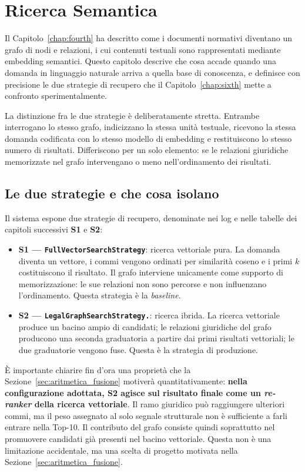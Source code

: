 \chapter{Ricerca Semantica}\label{chap:fifth}

\inlineminitoc

Il Capitolo~\ref{chap:fourth} ha descritto come i documenti normativi diventano un grafo di nodi e relazioni, i cui contenuti testuali sono rappresentati mediante embedding semantici. Questo capitolo descrive che cosa accade quando una domanda in linguaggio naturale arriva a quella base di conoscenza, e definisce con precisione le due strategie di recupero che il Capitolo~\ref{chap:sixth} mette a confronto sperimentalmente.

La distinzione fra le due strategie è deliberatamente stretta. Entrambe interrogano lo stesso grafo, indicizzano la stessa unità testuale, ricevono la stessa domanda codificata con lo stesso modello di embedding e restituiscono lo stesso numero di risultati. Differiscono per un solo elemento: se le relazioni giuridiche memorizzate nel grafo intervengano o meno nell'ordinamento dei risultati.

\section{Le due strategie e che cosa isolano}

Il sistema espone due strategie di recupero, denominate nei log e nelle tabelle dei capitoli successivi \textbf{S1} e \textbf{S2}:

\begin{itemize}
    \item \textbf{S1 --- \texttt{FullVectorSearchStrategy}}: ricerca vettoriale pura. La domanda diventa un vettore, i commi vengono ordinati per similarità coseno e i primi $k$ costituiscono il risultato. Il grafo interviene unicamente come supporto di memorizzazione: le sue relazioni non sono percorse e non influenzano l'ordinamento. Questa strategia è la \textit{baseline}.
    \item \textbf{S2 --- \texttt{LegalGraphSearchStrategy.}}: ricerca ibrida. La ricerca vettoriale produce un bacino ampio di candidati; le relazioni giuridiche del grafo producono una seconda graduatoria a partire dai primi risultati vettoriali; le due graduatorie vengono fuse. Questa è la strategia di produzione.
\end{itemize}

È importante chiarire fin d'ora una proprietà che la Sezione~\ref{sec:aritmetica_fusione} motiverà quantitativamente: \textbf{nella configurazione adottata, S2 agisce sul risultato finale come un \textit{re-ranker} della ricerca vettoriale}. Il ramo giuridico può raggiungere ulteriori commi, ma il peso assegnato al solo segnale strutturale non è sufficiente a farli entrare nella Top-10. Il contributo del grafo consiste quindi soprattutto nel promuovere candidati già presenti nel bacino vettoriale. Questa non è una limitazione accidentale, ma una scelta di progetto motivata nella Sezione~\ref{sec:aritmetica_fusione}.

